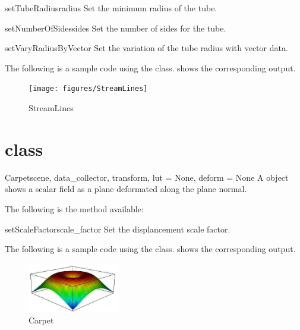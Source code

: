 \begin{methoddesc}[StreamLines]{setTubeRadius}{radius}
Set the minimum radius of the tube.
\end{methoddesc}

\begin{methoddesc}[StreamLines]{setNumberOfSides}{sides}
Set the number of sides for the tube.
\end{methoddesc}

\begin{methoddesc}[StreamLines]{setVaryRadiusByVector}{}
Set the variation of the tube radius with vector data.
\end{methoddesc}

The following is a sample code using the \StreamLines class.
 shows the corresponding output.


\begin{figure}[ht]
\begin{center}
\texttt{[image: figures/StreamLines]}
\end{center}
\caption{StreamLines}
\label{fig:streamlines.1}
\end{figure}

\section{\Carpet class}
\begin{classdesc}{Carpet}{scene, data_collector, transform, lut = None, 
deform = None}
A \Carpet object shows a scalar field as a plane deformated along the plane
normal.
\end{classdesc}

The following is the method available:
\begin{methoddesc}[Carpet]{setScaleFactor}{scale_factor}
Set the displancement scale factor.
\end{methoddesc}

The following is a sample code using the \Carpet class.
 shows the corresponding output.


\begin{figure}[ht]
\begin{center}
\includegraphics[width=40mm]{figures/Carpet}
\end{center}
\caption{Carpet}
\label{fig:carpet.1}
\end{figure}

